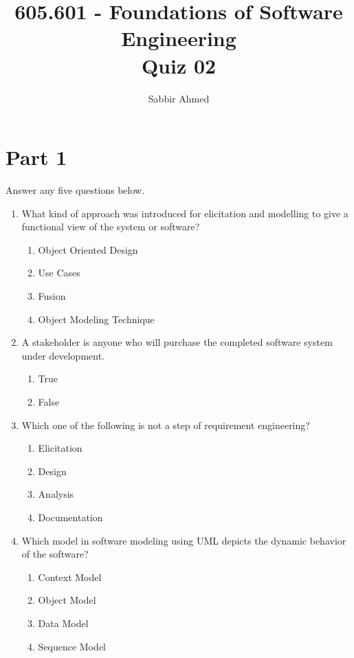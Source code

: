 \documentclass[12pt]{article}
\newcommand{\answeritem}{\global\answertrue\item}
\newcommand{\perhapsanswer}{%
  \ifanswer
    $\blacksquare$ \global\answerfalse
  \else
    $\square$ \global\answerfalse
  \fi
}
\newif\ifanswer
\begin{document}
  \title{605.601 - Foundations of Software Engineering \\ Quiz 02\vspace{-0.5em}}
  \author{Sabbir Ahmed}
  \maketitle
  \vspace{-1em}

  \section*{Part 1} Answer any five questions below.

  \begin{enumerate}

    \item What kind of approach was introduced for elicitation and modelling to give a functional view of the system or software?
    \begin{enumerate}[start=1,align=left,label={\protect\perhapsanswer(\alph*)}]
      \item Object Oriented Design
      \answeritem Use Cases
      \item Fusion
      \item Object Modeling Technique
    \end{enumerate}

    \item A stakeholder is anyone who will purchase the completed software system under development.
    \begin{enumerate}[start=1,align=left,label={\protect\perhapsanswer(\alph*)}]
      \item True
      \answeritem False
    \end{enumerate}

    \item Which one of the following is not a step of requirement engineering?
    \begin{enumerate}[start=1,align=left,label={\protect\perhapsanswer(\alph*)}]
      \item Elicitation
      \answeritem Design
      \item Analysis
      \item Documentation
    \end{enumerate}

    \item Which model in software modeling using UML depicts the dynamic behavior of the software?
    \begin{enumerate}[start=1,align=left,label={\protect\perhapsanswer(\alph*)}]
      \item Context Model
      \item Object Model
      \item Data Model
      \item Sequence Model
    \end{enumerate}


\end{enumerate}
\end{document}
